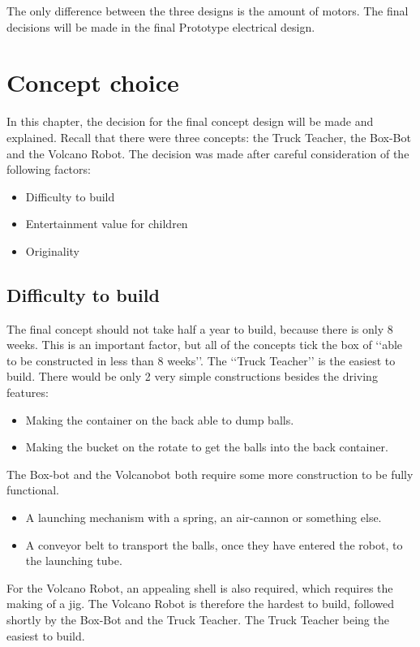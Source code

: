 \documentclass[11pt,twoside,a4paper]{report}
\begin{document}
The only difference between the three designs is the amount of motors. The final decisions will be made in the final Prototype electrical design.


\chapter{Concept choice}
In this chapter, the decision for the final concept design will be made and explained. Recall that there were three concepts: the Truck Teacher, the Box-Bot and the Volcano Robot. The decision was made after careful consideration of the following factors:
\begin{itemize}
\item Difficulty to build
\item Entertainment value for children
\item Originality
\end{itemize}
\section{Difficulty to build}
The final concept should not take half a year to build, because there is only 8 weeks. This is an important factor, but all of the concepts tick the box of \lq\lq{}able to be constructed in less than 8 weeks\rq\rq{}. The \lq\lq{}Truck Teacher\rq\rq{} is the easiest to build. There would be only 2 very simple constructions besides the driving features:
\begin{itemize}
\item Making the container on the back able to dump balls.
\item Making the bucket on the rotate to get the balls into the back container.
\end{itemize}
The Box-bot and the Volcanobot both require some more construction to be fully functional.
\begin{itemize}
\item A launching mechanism with a spring, an air-cannon or something else.
\item A conveyor belt to transport the balls, once they have entered the robot, to the launching tube.
\end{itemize}
For the Volcano Robot, an appealing shell is also required, which requires the making of a jig. The Volcano Robot is therefore the hardest to build, followed shortly by the Box-Bot and the Truck Teacher. The Truck Teacher being the easiest to build.
\end{document}
